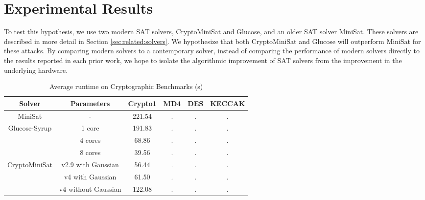 \section{Experimental Results}
\label{sec:results}


To test this hypothesis, we use two modern SAT solvers, CryptoMiniSat and Glucose, and an older SAT solver MiniSat. These solvers are described in more detail in Section \ref{sec:related:solvers}. 
We hypothesize that both CryptoMiniSat and Glucose will outperform MiniSat for these attacks. By comparing modern solvers to a contemporary solver, instead of comparing the performance of modern solvers directly to the results reported in each prior work, we hope to isolate the algorithmic improvement of SAT solvers from the improvement in the underlying hardware.


\begin{table}[!htbp]
	\centering
	\begin{tabular}{|c|c|c|c|c|c|}
		\hline
		\textbf{Solver} & \textbf{Parameters} & \textbf{Crypto1} & \textbf{MD4} & \textbf{DES} & \textbf{KECCAK} \\
		\hline
		MiniSat & - & 221.54 & . & . & .\\
		\hline
		\multirow{3}{*}{Glucose-Syrup} & 1 core & 191.83 & . & . & .\\ \cline{2-3}
		& 4 cores & 68.86 & . & . & .\\ \cline{2-3}
		& 8 cores & 39.56 & . & . & .\\
		\hline
		
		\multirow{3}{*}{CryptoMiniSat} & v2.9 with Gaussian & 56.44 & . & . & . \\ \cline{2-3}
		& v4 with Gaussian & 61.50 & . & . & . \\ \cline{2-3}
		& v4 without Gaussian & 122.08 & . & . & .\\
		\hline
	\end{tabular}
	
	\caption{Average runtime on Cryptographic Benchmarks (s)}
	\label{table:crypto1:runtime}
\end{table}